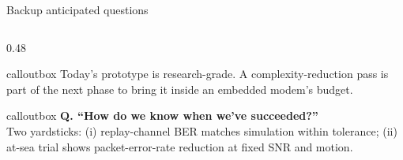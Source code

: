 \documentclass[aspectratio=169,10pt]{beamer}
\begin{document}
\begin{frame}{Backup \textendash{} anticipated questions}
\begin{columns}[T,onlytextwidth]
\begin{column}{0.48\textwidth}
\begin{beamercolorbox}[wd=\linewidth,sep=6pt,rounded=true]{calloutbox}
        Today's prototype is research-grade. A complexity-reduction pass is part of the next phase to bring it inside an embedded modem's budget.
      \end{beamercolorbox}
      \vspace{0.3em}
      \begin{beamercolorbox}[wd=\linewidth,sep=6pt,rounded=true]{calloutbox}
        \textbf{Q. ``How do we know when we've succeeded?''}\\
        Two yardsticks: (i) replay-channel BER matches simulation within tolerance; (ii) at-sea trial shows packet-error-rate reduction at fixed SNR and motion.
      \end{beamercolorbox}
    \end{column}
  \end{columns}
\end{frame}
\end{document}
